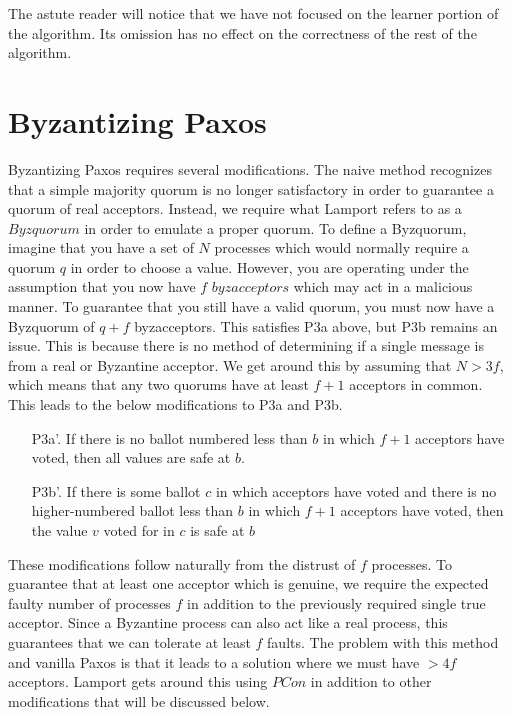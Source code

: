 \documentclass[conference]{IEEEtran}
\begin{document}
The astute reader will notice that we have not focused on the learner portion of the algorithm. Its omission has no effect on the correctness of the rest of the algorithm.



\section{Byzantizing Paxos}
Byzantizing Paxos requires several modifications. The naive method recognizes that a simple majority quorum is no longer satisfactory in order to guarantee a quorum of real acceptors. Instead, we require what Lamport refers to as a $Byzquorum$ in order to emulate a proper quorum. To define a Byzquorum, imagine that you have a set of $N$ processes which would normally require a quorum $q$ in order to choose a value. However, you are operating under the assumption that you now have $f$ $byzacceptors$ which may act in a malicious manner. To guarantee that you still have a valid quorum, you must now have a Byzquorum of $q + f$ byzacceptors. This satisfies P3a above, but P3b remains an issue. This is because there is no method of determining if a single message is from a real or Byzantine acceptor. We get around this by assuming that $N > 3f$, which means that any two quorums have at least $f + 1$ acceptors in common. This leads to the below modifications to P3a and P3b.
\smallskip
\begin{enumerate}[leftmargin=4em]
\item[P3a'.] If there is no ballot numbered less than $b$ in which $f + 1$ acceptors have voted, then all values are safe at $b$.
\item[P3b'.] If there is some ballot $c$ in which acceptors have voted and there is no higher-numbered ballot less than $b$ in which $f + 1$ acceptors have voted, then the value $v$ voted for in $c$ is safe at $b$
\end{enumerate}
\smallskip

These modifications follow naturally from the distrust of $f$ processes. To guarantee that at least one acceptor which is genuine, we require the expected faulty number of processes $f$ in addition to the previously required single true acceptor. Since a Byzantine process can also act like a real process, this guarantees that we can tolerate at least $f$ faults. The problem with this method and vanilla Paxos is that it leads to a solution where we must have $>4f$ acceptors. Lamport gets around this using $PCon$ in addition to other modifications that will be discussed below.
\end{document}
